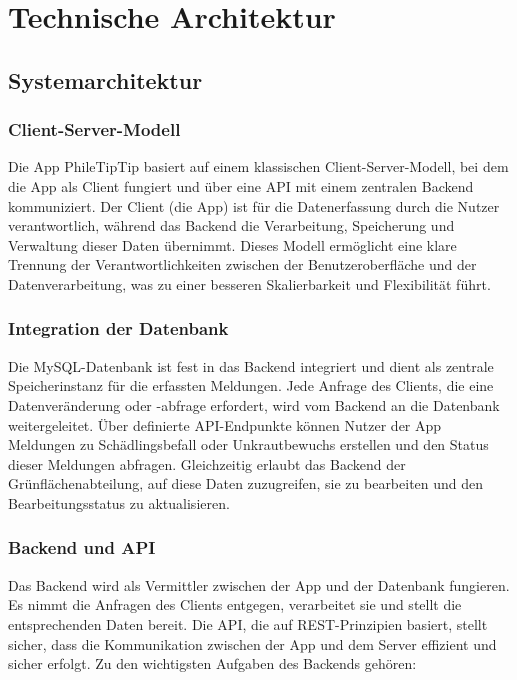 \section{Technische Architektur}
\subsection{Systemarchitektur}

\subsubsection{Client-Server-Modell}

Die App PhileTipTip basiert auf einem klassischen Client-Server-Modell, bei dem die App als Client fungiert und über eine API mit einem zentralen Backend kommuniziert. Der Client (die App) ist für die Datenerfassung durch die Nutzer verantwortlich, während das Backend die Verarbeitung, Speicherung und Verwaltung dieser Daten übernimmt. Dieses Modell ermöglicht eine klare Trennung der Verantwortlichkeiten zwischen der Benutzeroberfläche und der Datenverarbeitung, was zu einer besseren Skalierbarkeit und Flexibilität führt.

\subsubsection{Integration der Datenbank}

Die MySQL-Datenbank ist fest in das Backend integriert und dient als zentrale Speicherinstanz für die erfassten Meldungen. Jede Anfrage des Clients, die eine Datenveränderung oder -abfrage erfordert, wird vom Backend an die Datenbank weitergeleitet. Über definierte API-Endpunkte können Nutzer der App Meldungen zu Schädlingsbefall oder Unkrautbewuchs erstellen und den Status dieser Meldungen abfragen. Gleichzeitig erlaubt das Backend der Grünflächenabteilung, auf diese Daten zuzugreifen, sie zu bearbeiten und den Bearbeitungsstatus zu aktualisieren.

\subsubsection{Backend und API}

Das Backend wird als Vermittler zwischen der App und der Datenbank fungieren. Es nimmt die Anfragen des Clients entgegen, verarbeitet sie und stellt die entsprechenden Daten bereit. Die API, die auf REST-Prinzipien basiert, stellt sicher, dass die Kommunikation zwischen der App und dem Server effizient und sicher erfolgt. Zu den wichtigsten Aufgaben des Backends gehören:

